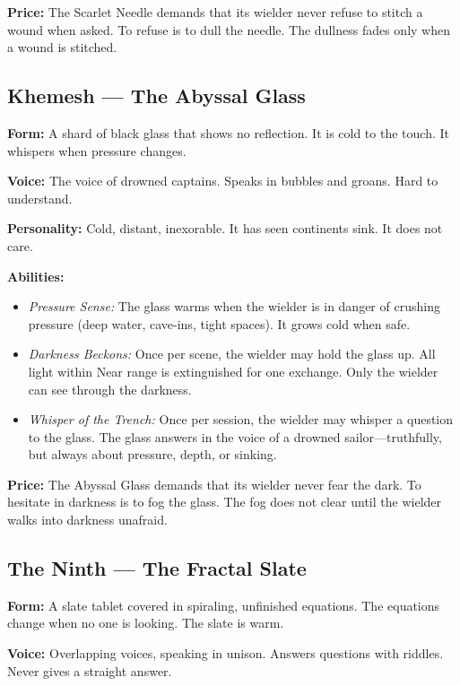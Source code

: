 \noindent\textbf{Price:} The Scarlet Needle demands that its wielder never refuse to stitch a wound when asked. To refuse is to dull the needle. The dullness fades only when a wound is stitched.

\subsection{Khemesh — The Abyssal Glass}

\noindent\textbf{Form:} A shard of black glass that shows no reflection. It is cold to the touch. It whispers when pressure changes.

\noindent\textbf{Voice:} The voice of drowned captains. Speaks in bubbles and groans. Hard to understand.

\noindent\textbf{Personality:} Cold, distant, inexorable. It has seen continents sink. It does not care.

\noindent\textbf{Abilities:}
\begin{itemize}
\item \textit{Pressure Sense:} The glass warms when the wielder is in danger of crushing pressure (deep water, cave-ins, tight spaces). It grows cold when safe.
\item \textit{Darkness Beckons:} Once per scene, the wielder may hold the glass up. All light within Near range is extinguished for one exchange. Only the wielder can see through the darkness.
\item \textit{Whisper of the Trench:} Once per session, the wielder may whisper a question to the glass. The glass answers in the voice of a drowned sailor—truthfully, but always about pressure, depth, or sinking.
\end{itemize}

\noindent\textbf{Price:} The Abyssal Glass demands that its wielder never fear the dark. To hesitate in darkness is to fog the glass. The fog does not clear until the wielder walks into darkness unafraid.

\subsection{The Ninth — The Fractal Slate}

\noindent\textbf{Form:} A slate tablet covered in spiraling, unfinished equations. The equations change when no one is looking. The slate is warm.

\noindent\textbf{Voice:} Overlapping voices, speaking in unison. Answers questions with riddles. Never gives a straight answer.

